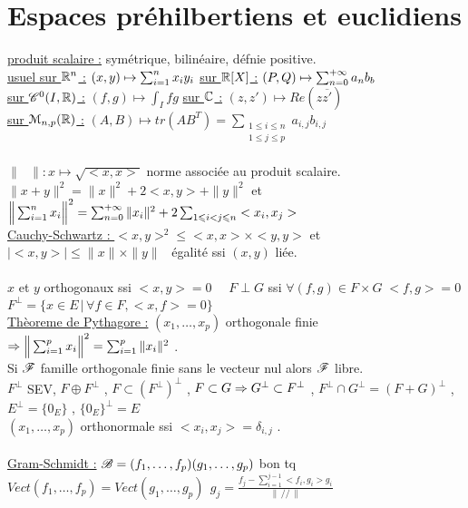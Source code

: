 \documentclass[12 pt]{book}
\begin{document}
\section*{Espaces préhilbertiens et euclidiens}
\underline{produit scalaire :} symétrique, bilinéaire, défnie positive.\\
\underline{usuel sur $\mathbb{R}^n$ :} $(x,y) \mapsto \sum_{i=1}^n x_i y_i$ \qquad \qquad \underline{sur $\mathbb{R}[X]$ :} $(P,Q) \mapsto \sum_{n=0}^{+\infty} a_n b_b$ \\
\underline{sur $\mathscr{C}^0(I,\mathbb{R})$ :} $(f,g) \mapsto \int_I fg$ \qquad \qquad \underline{sur $\mathbb{C}$ :} $(z,z') \mapsto Re(z\overline{z'})$\\
\underline{sur $\mathcal{M}_{n,p}(\mathbb{R})$ :} $(A,B)\mapsto tr(AB^T) = \sum_{\substack{1\leqslant i \leqslant n \\ 1\leqslant j \leqslant p}} a_{i,j} b_{i,j}$\\
\text{}\\
$\|\text{ }\| : x\mapsto \sqrt{<x,x>}$ norme associée au produit scalaire.\\
$\|x+y\|^2 = \|x\|^2+2<x,y>+\|y\|^2$  et  $\Big\| \sum_{i=1}^n x_i\Big\|^2 = \sum_{n=0}^{+\infty} \|x_i\|^2 + 2 \sum_{1\leqslant i<j\leqslant n} <x_i,x_j>$\\
\underline{Cauchy-Schwartz : } $<x,y>^2 \leqslant <x,x>\times <y,y>$ et $|<x,y>|\leqslant \|x\| \times \|y\|$ \ égalité ssi $(x,y)$ liée.\\
\text{}\\
$x$ et $y$ orthogonaux ssi $<x,y> =0$ \ \ $F\perp G$ ssi $\forall (f,g)\in F\times G  \; <f,g>=0$ \\ $F^\perp = \{x\in E \, | \, \forall f\in F, <x,f>=0\}$\\
\underline{Thèoreme de Pythagore :} $(x_1,\dots,x_p)$ orthogonale finie $\Rightarrow  \Big\| \sum_{i=1}^p x_i \Big\|^2 = \sum_{i=1}^p \| x_i\|^2$ .\\
Si $\mathscr{F}$ famille orthogonale finie sans le vecteur nul alors $\mathscr{F}$ libre.\\
$F^\perp$ SEV, $F\oplus F^\perp$ , $F\subset(F^\perp)^\perp$ , $F\subset G \Rightarrow G^\perp \subset F^\perp$ , $F^\perp \cap G^\perp = (F+G)^\perp$ , $E^\perp = \{0_E\}$ , $\{0_E\}^\perp = E$\\
$(x_1,\dots,x_p)$ orthonormale ssi $<x_i,x_j> = \delta_{i,j}$ .\\
\text{}\\
\underline{Gram-Schmidt :} $ \mathscr{B} = (f_1,\dots,f_p)\\
(g_1,\dots,g_p)$ bon tq $Vect(f_1,\dots,f_p) = Vect(g_1,\dots,g_p) \ \ g_j = \frac{\displaystyle f_j - \sum_{i=1}^{j-1} <f_i,g_i> g_i}{\|\, // \,\|}$\\
\end{document}
